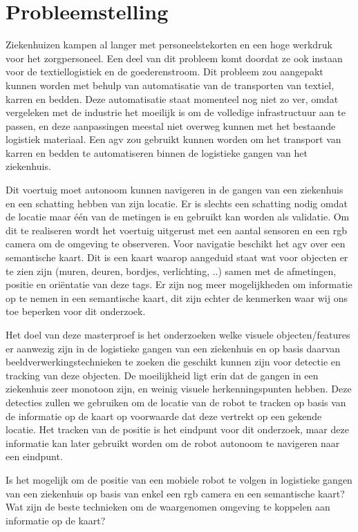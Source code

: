 
\chapter{Probleemstelling}

Ziekenhuizen kampen al langer met personeelstekorten en een hoge werkdruk voor het zorgpersoneel. Een deel van dit probleem komt doordat ze ook instaan voor de textiellogistiek en de goederenstroom.
Dit probleem zou aangepakt kunnen worden met behulp van automatisatie van de transporten van textiel, karren en bedden. Deze automatisatie staat momenteel nog niet zo ver, omdat vergeleken met de industrie het moeilijk is om de volledige
infrastructuur aan te passen, en deze aanpassingen meestal niet overweg kunnen met het bestaande logistiek materiaal. Een \gls{agv} zou gebruikt kunnen worden om het transport van karren en bedden te automatiseren binnen de logistieke gangen van het ziekenhuis.

Dit voertuig moet autonoom kunnen navigeren in de gangen van een ziekenhuis en een schatting hebben van zijn locatie.
Er is slechts een schatting nodig omdat de locatie maar \'{e}\'{e}n van de metingen is en gebruikt kan worden als validatie.
Om dit te realiseren
wordt het voertuig uitgerust met een aantal sensoren en een \gls{rgb} camera om de omgeving te observeren. Voor navigatie beschikt het \gls{agv}
over een semantische kaart.
Dit is een kaart waarop aangeduid staat wat voor objecten er te zien zijn (muren, deuren, bordjes, verlichting, ..) samen met de afmetingen, positie en ori\"{e}ntatie van deze tags.
Er zijn nog meer mogelijkheden om informatie op te nemen in een semantische kaart, dit zijn echter de kenmerken waar wij ons toe beperken voor dit onderzoek.

Het doel van deze masterproef is het onderzoeken welke visuele objecten/features er aanwezig zijn in de logistieke gangen van een ziekenhuis en op basis daarvan
beeldverwerkingstechnieken te zoeken die geschikt kunnen zijn voor detectie en tracking van deze objecten.
De moeilijkheid ligt erin dat de gangen in een ziekenhuis zeer monotoon zijn, en weinig visuele herkenningspunten hebben.
Deze detecties zullen we gebruiken om de locatie van de robot te tracken op basis van de informatie op de kaart op voorwaarde dat deze vertrekt op een gekende locatie.
Het tracken van de positie is het eindpunt voor dit onderzoek, maar deze informatie kan later gebruikt worden om de robot autonoom te navigeren naar een eindpunt.

Is het mogelijk om de positie van een mobiele robot te volgen in logistieke gangen van een ziekenhuis op basis van enkel een \gls{rgb} camera en een
semantische kaart? Wat zijn de beste technieken om de waargenomen omgeving te koppelen aan informatie op de kaart?